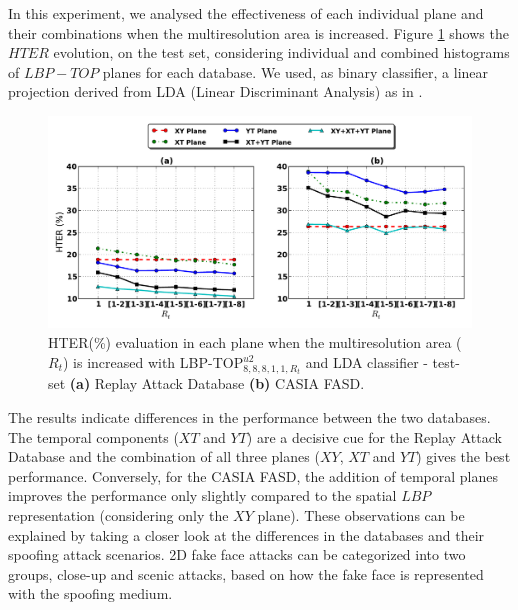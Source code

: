 In this experiment, we analysed the effectiveness of each individual plane and their combinations when the multiresolution area is increased. Figure \ref{fig:planes_evaluation_LDA} shows the $HTER$ evolution, on the test set, considering individual and combined histograms of $LBP-TOP$ planes for each database. We used, as binary classifier, a linear projection derived from LDA (Linear Discriminant Analysis) as in \cite{ChingovskaBIOSIG2012}.

\begin{figure}[!htb]
\begin{center}
\includegraphics [width=\textwidth] {images/proposed_countermeasure/planes_evaluation_LDA.pdf}
\caption[HTER(\%) evaluation in each plane when the multiresolution area ($R_t$) is increased]{HTER(\%) evaluation in each plane when the multiresolution area ($R_t$) is increased with LBP-TOP$_{8,8,8,1,1,R_t}^{u2}$ and LDA classifier - test-set \textbf{(a)} Replay Attack Database \textbf{(b)} CASIA FASD.} \label{fig:planes_evaluation_LDA}
\end{center}
\end{figure}

The results indicate differences in the performance between the two databases. The temporal components ($XT$ and $YT$) are a decisive cue for the Replay Attack Database and the combination of all three planes ($XY$, $XT$ and $YT$) gives the best performance. Conversely, for the CASIA FASD, the addition of temporal planes improves the performance only slightly compared to the spatial $LBP$ representation (considering only the $XY$ plane). These observations can be explained by taking a closer look at the differences in the databases and their spoofing attack scenarios. 2D fake face attacks can be categorized into two groups, close-up and scenic attacks, based on how the fake face is represented with the spoofing medium.

